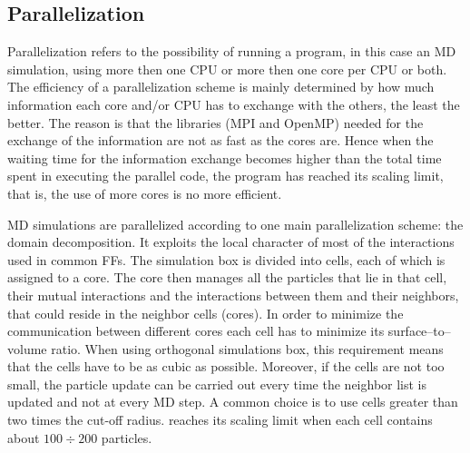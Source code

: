 \subsection{Parallelization}
Parallelization refers to the possibility of running a program, in this case an \ac{MD} simulation, using more 
then one CPU or more then one core per CPU or both. The efficiency of a parallelization scheme is mainly 
determined by how much information each core and/or CPU has to exchange with the others, the least the better. 
The reason is that the libraries (MPI and OpenMP) needed for the exchange of the information are not as fast as 
the cores are. Hence when the waiting time for the information exchange becomes higher than the total time spent 
in executing the parallel code, the program has reached its scaling limit, that is, the use of more cores is no 
more efficient.

\ac{MD} simulations are parallelized according to one main parallelization scheme: the domain decomposition. It 
exploits the local character of most of the interactions used in common \acp{FF}. The simulation box is divided 
into cells, each of which is assigned to a core. The core then manages all the particles that lie in that cell, 
their mutual interactions and the interactions between them and their neighbors, that could reside in the 
neighbor cells (cores). In order to minimize the communication between different cores each cell has to minimize 
its surface--to--volume ratio. When using orthogonal simulations box, this requirement means that the cells have 
to be as cubic as possible. Moreover, if the cells are not too small, the particle update can be carried out 
every time the neighbor list is updated and not at every \ac{MD} step. A common choice is to use cells greater 
than two times the cut-off radius. \gromacs{} reaches its scaling limit when each cell contains about 
$100 \div 200$ particles.

